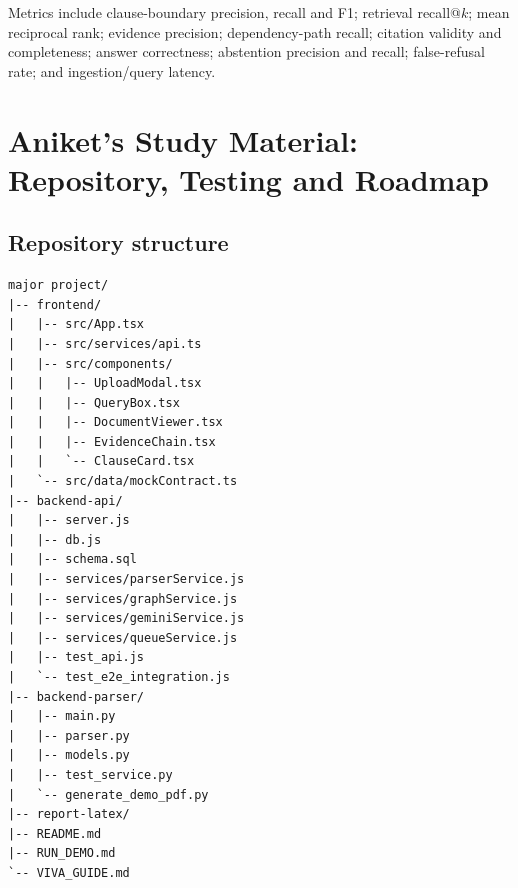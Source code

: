 \documentclass[11pt,letterpaper]{article}
\begin{document}
Metrics include clause-boundary precision, recall and F1; retrieval recall@$k$; mean reciprocal rank; evidence precision; dependency-path recall; citation validity and completeness; answer correctness; abstention precision and recall; false-refusal rate; and ingestion/query latency.

\newpage
\section{Aniket's Study Material: Repository, Testing and Roadmap}
\subsection{Repository structure}
\begin{lstlisting}
major project/
|-- frontend/
|   |-- src/App.tsx
|   |-- src/services/api.ts
|   |-- src/components/
|   |   |-- UploadModal.tsx
|   |   |-- QueryBox.tsx
|   |   |-- DocumentViewer.tsx
|   |   |-- EvidenceChain.tsx
|   |   `-- ClauseCard.tsx
|   `-- src/data/mockContract.ts
|-- backend-api/
|   |-- server.js
|   |-- db.js
|   |-- schema.sql
|   |-- services/parserService.js
|   |-- services/graphService.js
|   |-- services/geminiService.js
|   |-- services/queueService.js
|   |-- test_api.js
|   `-- test_e2e_integration.js
|-- backend-parser/
|   |-- main.py
|   |-- parser.py
|   |-- models.py
|   |-- test_service.py
|   `-- generate_demo_pdf.py
|-- report-latex/
|-- README.md
|-- RUN_DEMO.md
`-- VIVA_GUIDE.md
\end{lstlisting}
\end{document}
